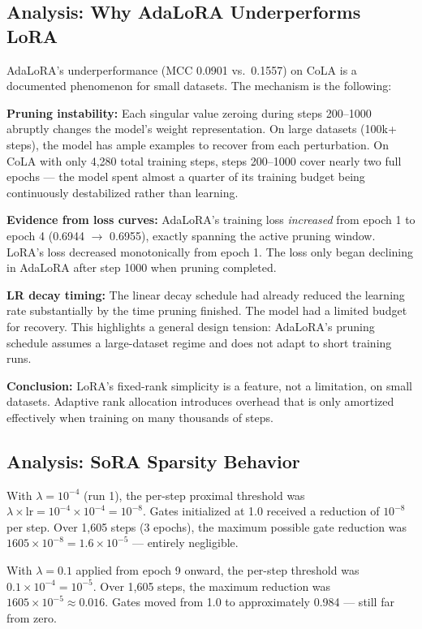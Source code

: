 \documentclass[12pt,a4paper]{article}
\theoremstyle{definition}
\begin{document}
\subsection{Analysis: Why AdaLoRA Underperforms LoRA}
\label{sec:adalora_analysis}

AdaLoRA's underperformance (MCC 0.0901 vs.\ 0.1557) on CoLA is a documented phenomenon for small datasets. The mechanism is the following:

\textbf{Pruning instability:} Each singular value zeroing during steps 200--1000 abruptly changes the model's weight representation. On large datasets (100k+ steps), the model has ample examples to recover from each perturbation. On CoLA with only 4,280 total training steps, steps 200--1000 cover nearly two full epochs — the model spent almost a quarter of its training budget being continuously destabilized rather than learning.

\textbf{Evidence from loss curves:} AdaLoRA's training loss \textit{increased} from epoch 1 to epoch 4 (0.6944 $\to$ 0.6955), exactly spanning the active pruning window. LoRA's loss decreased monotonically from epoch 1. The loss only began declining in AdaLoRA after step 1000 when pruning completed.

\textbf{LR decay timing:} The linear decay schedule had already reduced the learning rate substantially by the time pruning finished. The model had a limited budget for recovery. This highlights a general design tension: AdaLoRA's pruning schedule assumes a large-dataset regime and does not adapt to short training runs.

\textbf{Conclusion:} LoRA's fixed-rank simplicity is a feature, not a limitation, on small datasets. Adaptive rank allocation introduces overhead that is only amortized effectively when training on many thousands of steps.

\subsection{Analysis: SoRA Sparsity Behavior}
\label{sec:sora_sparsity}

With $\lambda = 10^{-4}$ (run 1), the per-step proximal threshold was $\lambda \times \text{lr} = 10^{-4} \times 10^{-4} = 10^{-8}$. Gates initialized at 1.0 received a reduction of $10^{-8}$ per step. Over 1,605 steps (3 epochs), the maximum possible gate reduction was $1605 \times 10^{-8} = 1.6 \times 10^{-5}$ — entirely negligible.

With $\lambda = 0.1$ applied from epoch 9 onward, the per-step threshold was $0.1 \times 10^{-4} = 10^{-5}$. Over 1,605 steps, the maximum reduction was $1605 \times 10^{-5} \approx 0.016$. Gates moved from 1.0 to approximately 0.984 — still far from zero.
\end{document}
